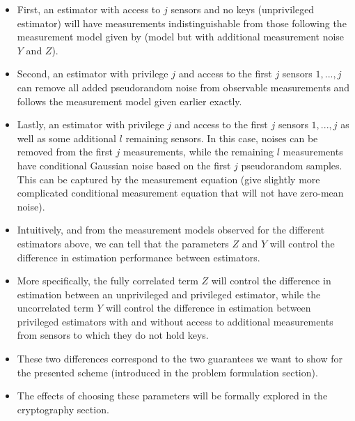 \documentclass[conference]{IEEEtran}
\begin{document}
\begin{itemize}
  \item First, an estimator with access to $j$ sensors and no keys (unprivileged estimator) will have measurements indistinguishable from those following the measurement model given by (model but with additional measurement noise $Y$ and $Z$).
  \item Second, an estimator with privilege $j$ and access to the first $j$ sensors $1,...,j$ can remove all added pseudorandom noise from observable measurements and follows the measurement model given earlier exactly.
  \item Lastly, an estimator with privilege $j$ and access to the first $j$ sensors $1,...,j$ as well as some additional $l$ remaining sensors. In this case, noises can be removed from the first $j$ measurements, while the remaining $l$ measurements have conditional Gaussian noise based on the first $j$ pseudorandom samples. This can be captured by the measurement equation (give slightly more complicated conditional measurement equation that will not have zero-mean noise).
  \item Intuitively, and from the measurement models observed for the different estimators above, we can tell that the parameters $Z$ and $Y$ will control the difference in estimation performance between estimators.
  \item More specifically, the fully correlated term $Z$ will control the difference in estimation between an unprivileged and privileged estimator, while the uncorrelated term $Y$ will control the difference in estimation between privileged estimators with and without access to additional measurements from sensors to which they do not hold keys.
  \item These two differences correspond to the two guarantees we want to show for the presented scheme (introduced in the problem formulation section).
  \item The effects of choosing these parameters will be formally explored in the cryptography section.
\end{itemize}
\end{document}
